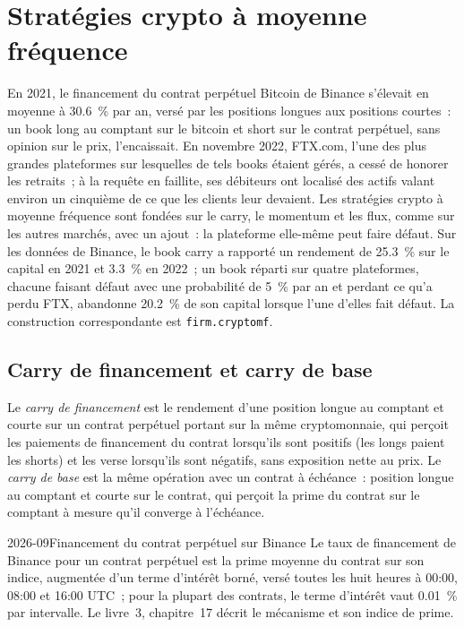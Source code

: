 \chapter{Stratégies crypto à moyenne fréquence}\label{ch:s1:crypto-medium-frequency-strategies}

En 2021, le financement du contrat perpétuel Bitcoin de Binance s'élevait en moyenne à 30.6~\% par an, versé par les positions longues aux positions courtes~: un book long au comptant sur le bitcoin et short sur le contrat perpétuel,
sans opinion sur le prix, l'encaissait. En novembre 2022, FTX.com, l'une des plus grandes plateformes sur lesquelles de tels books étaient gérés, a cessé de honorer les retraits~;
à la requête en faillite, ses débiteurs ont localisé des actifs valant environ un cinquième de ce que les clients leur devaient. Les stratégies crypto à moyenne fréquence sont fondées sur le carry, le momentum
et les flux, comme sur les autres marchés, avec un ajout~: la plateforme elle-même peut faire défaut. Sur les données de Binance, le book carry a rapporté un rendement de 25.3~\% sur le capital en 2021 et
3.3~\% en 2022~; un book réparti sur quatre plateformes, chacune faisant défaut avec une probabilité de 5~\% par an et perdant ce qu'a perdu FTX, abandonne 20.2~\% de son capital lorsque
l'une d'elles fait défaut. La construction correspondante est \texttt{firm.cryptomf}.

\section{Carry de financement et carry de base}

\begin{definition}\label{def:s1:crypto-medium-frequency-strategies:carry}
Le \emph{carry de financement} est le rendement d'une position longue au comptant et courte sur un contrat perpétuel portant sur la même cryptomonnaie, qui perçoit les
paiements de financement du contrat lorsqu'ils sont positifs (les longs paient les shorts) et les verse lorsqu'ils sont négatifs, sans exposition nette au prix. Le \emph{carry de
base} est la même opération avec un contrat à échéance~: position longue au comptant et courte sur le contrat, qui perçoit la prime du contrat sur le comptant à mesure qu'il converge
à l'échéance.
\end{definition}

\begin{dated}{2026-09}{Financement du contrat perpétuel sur Binance}\label{dat:s1:crypto-medium-frequency-strategies:funding}
Le taux de financement de Binance pour un contrat perpétuel est la prime moyenne du contrat sur son indice, augmentée d'un terme d'intérêt borné, versé toutes les huit heures à
00:00, 08:00 et 16:00 UTC~; pour la plupart des contrats, le terme d'intérêt vaut 0.01~\% par intervalle. Le livre~3, chapitre~17 décrit le mécanisme et son
indice de prime.
\end{dated}

